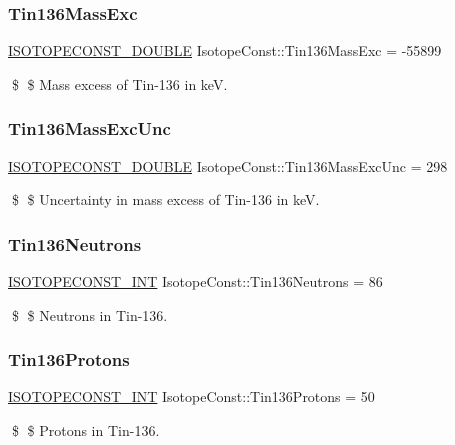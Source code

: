 \subsubsection{\texorpdfstring{Tin136\+Mass\+Exc}{Tin136MassExc}}
{\footnotesize\ttfamily \mbox{\hyperlink{group___isotope_const-_macros_ga8f45a7272ce02c0b4c65c44636ed719a}{I\+S\+O\+T\+O\+P\+E\+C\+O\+N\+S\+T\+\_\+\+D\+O\+U\+B\+LE}} Isotope\+Const\+::\+Tin136\+Mass\+Exc = -\/55899}

\$ \$ Mass excess of Tin-\/136 in keV. \mbox{\label{group___isotope_const-_tin-_sn136_gae5633a5a4d4355917f41240e880784a0}} 
\subsubsection{\texorpdfstring{Tin136\+Mass\+Exc\+Unc}{Tin136MassExcUnc}}
{\footnotesize\ttfamily \mbox{\hyperlink{group___isotope_const-_macros_ga8f45a7272ce02c0b4c65c44636ed719a}{I\+S\+O\+T\+O\+P\+E\+C\+O\+N\+S\+T\+\_\+\+D\+O\+U\+B\+LE}} Isotope\+Const\+::\+Tin136\+Mass\+Exc\+Unc = 298}

\$ \$ Uncertainty in mass excess of Tin-\/136 in keV. \mbox{\label{group___isotope_const-_tin-_sn136_ga0054a4d173a42905f9173de54dd39f33}} 
\subsubsection{\texorpdfstring{Tin136\+Neutrons}{Tin136Neutrons}}
{\footnotesize\ttfamily \mbox{\hyperlink{group___isotope_const-_macros_ga5f18360b3e99483a35c32d789e62621c}{I\+S\+O\+T\+O\+P\+E\+C\+O\+N\+S\+T\+\_\+\+I\+NT}} Isotope\+Const\+::\+Tin136\+Neutrons = 86}

\$ \$ Neutrons in Tin-\/136. \mbox{\label{group___isotope_const-_tin-_sn136_ga804b5eb8e88b5831a0e538ea6876e855}} 
\subsubsection{\texorpdfstring{Tin136\+Protons}{Tin136Protons}}
{\footnotesize\ttfamily \mbox{\hyperlink{group___isotope_const-_macros_ga5f18360b3e99483a35c32d789e62621c}{I\+S\+O\+T\+O\+P\+E\+C\+O\+N\+S\+T\+\_\+\+I\+NT}} Isotope\+Const\+::\+Tin136\+Protons = 50}

\$ \$ Protons in Tin-\/136. 